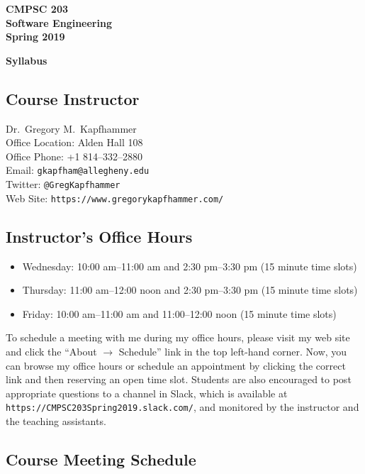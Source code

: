 \documentclass[11pt]{article}
\newcommand{\url}[1]{\lstinline{#1}}
\newcommand{\syllabustitle}[1]
{
  \begin{center}
    \begin{center}
      \bf
      CMPSC 203\\Software Engineering\\
      Spring 2019\\
      \medskip
    \end{center}
    \bf
    #1
  \end{center}
}
\begin{document}
\thispagestyle{empty}

\syllabustitle{Syllabus}

\vspace*{-1em}
\subsection*{Course Instructor}
Dr.\ Gregory M.\ Kapfhammer\\
\noindent Office Location: Alden Hall 108 \\
\noindent Office Phone: +1 814--332--2880 \\
\noindent Email: \url{gkapfham@allegheny.edu} \\
\noindent Twitter: \url{@GregKapfhammer} \\
\noindent Web Site: \url{https://www.gregorykapfhammer.com/}

\subsection*{Instructor's Office Hours}


\begin{itemize}

  \itemsep0em

  \item Wednesday: 10:00 am--11:00 am and 2:30 pm--3:30 pm (15 minute time slots)

  \item Thursday: 11:00 am--12:00 noon and 2:30 pm--3:30 pm (15 minute time slots)

  \item Friday: 10:00 am--11:00 am and 11:00--12:00 noon (15 minute time slots)

\end{itemize}

\noindent To schedule a meeting with me during my office hours, please visit my
web site and click the ``About $\rightarrow$ Schedule'' link in the top left-hand corner. Now, you
can browse my office hours or schedule an appointment by clicking the correct
link and then reserving an open time slot. Students are also encouraged to post
appropriate questions to a channel in Slack, which is available at
\url{https://CMPSC203Spring2019.slack.com/}, and monitored by the instructor and
the teaching assistants.

\subsection*{Course Meeting Schedule}
\end{document}
